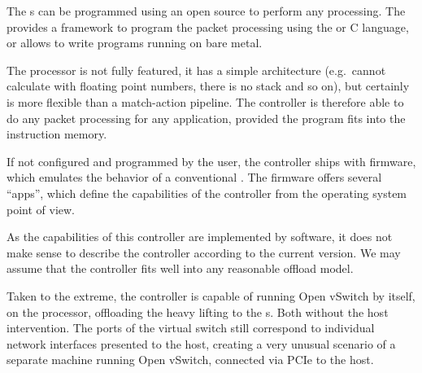The s can be programmed using an open source  to perform any
processing. The  provides a framework to program the packet processing
using the  or C language, or allows to write programs running on bare
metal.

The processor is not fully featured, it has a simple architecture (e.g.\ cannot
calculate with floating point numbers, there is no stack and so on), but
certainly is more flexible than a match-action pipeline. The controller is
therefore able to do any packet processing for any application, provided the
program fits into the instruction memory.

If not configured and programmed by the user, the controller ships with
firmware, which emulates the behavior of a conventional . The firmware
offers several ``apps'', which define the capabilities of the controller from
the operating system point of view.

As the capabilities of this controller are implemented by software, it does not
make sense to describe the controller according to the current version. We may
assume that the controller fits well into any reasonable offload model.

Taken to the extreme, the controller is capable of running Open vSwitch by
itself, on the  processor, offloading the heavy lifting to the s.
Both without the host intervention. The ports of the virtual switch still
correspond to individual network interfaces presented to the host, creating
a very unusual scenario of a separate machine running Open vSwitch, connected
via PCIe to the host.
